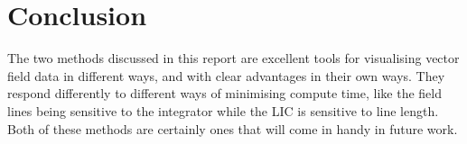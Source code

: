 \documentclass{article}
\begin{document}
\section{Conclusion}
The two methods discussed in this report are excellent tools for visualising
vector field data in different ways, and with clear advantages in their own ways.
They respond differently to different ways of minimising compute time, like the field
lines being sensitive to the integrator while the LIC is sensitive to line length.
Both of these methods are certainly ones that will come in handy in future work.
\end{document}
